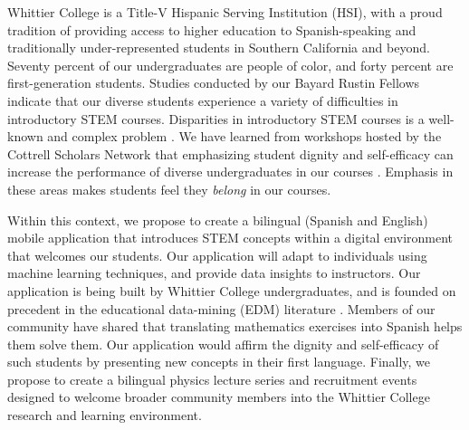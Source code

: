 \documentclass[../../main.tex]{subfiles}
\begin{document}
Whittier College is a Title-V Hispanic Serving Institution (HSI), with a proud tradition of providing access to higher education to Spanish-speaking and traditionally under-represented students in Southern California and beyond.  Seventy percent of our undergraduates are people of color, and forty percent are first-generation students.  Studies conducted by our Bayard Rustin Fellows indicate that our diverse students experience a variety of difficulties in introductory STEM courses.  Disparities in introductory STEM courses is a well-known and complex problem \cite{doi:10.1146/annurev-soc-071312-145659}.  We have learned from workshops hosted by the Cottrell Scholars Network that emphasizing student dignity and self-efficacy can increase the performance of diverse undergraduates in our courses \cite{cottrell1,cottrell2}.  Emphasis in these areas makes students feel they \textit{belong} in our courses. \\ \vspace{2.5mm}

Within this context, we propose to create a bilingual (Spanish and English) mobile application that introduces STEM concepts within a digital environment that welcomes our students.  Our application will adapt to individuals using machine learning techniques, and provide data insights to instructors.  Our application is being built by Whittier College undergraduates, and is founded on precedent in the educational data-mining (EDM) literature \cite{edm1,edm2,edm3,edm4}.  Members of our community have shared that translating mathematics exercises into Spanish helps them solve them.  Our application would affirm the dignity and self-efficacy of such students by presenting new concepts in their first language.  Finally, we propose to create a bilingual physics lecture series and recruitment events designed to welcome broader community members into the Whittier College research and learning environment.

\clearpage
\end{document}
